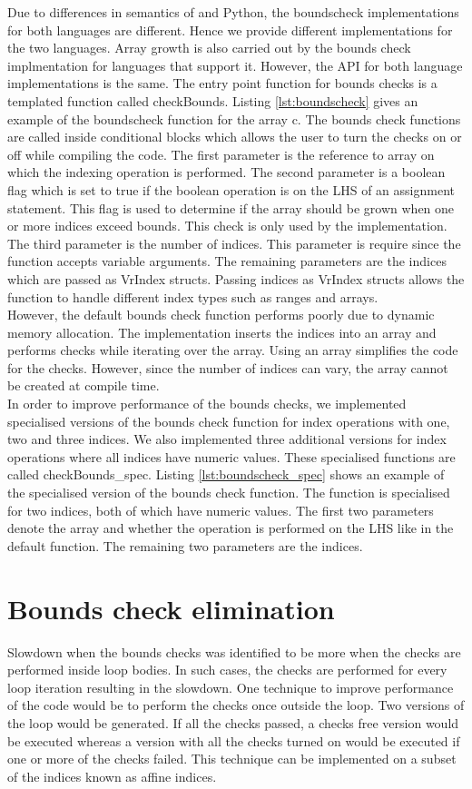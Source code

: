 Due to differences in semantics of \matlab and Python, the boundscheck implementations for both languages are different. Hence we provide different implementations for the two languages. Array growth is also carried out by the bounds check implmentation for languages that support it. However, the API for both language implementations is the same. The entry point function for bounds checks is a templated function called checkBounds. Listing \ref{lst:boundscheck} gives an example of the boundscheck function for the array c. The bounds check functions are called inside conditional blocks which allows the user to turn the checks on or off while compiling the code. The first parameter is the reference to array on which the indexing operation is performed. The second parameter is a boolean flag which is set to true if the boolean operation is on the LHS of an assignment statement. This flag is used to determine if the array should be grown when one or more indices exceed bounds. This check is only used by the \matlab implementation. The third parameter is the number of indices. This parameter is require since the function accepts variable arguments. The remaining parameters are the indices which are passed as VrIndex structs. Passing indices as VrIndex structs allows the function to handle different index types such as ranges and arrays. \\
However, the default bounds check function performs poorly due to dynamic memory allocation. The implementation inserts the indices into an array and performs checks while iterating over the array. Using an array simplifies the code for the checks. However, since the number of indices can vary, the array cannot be created at compile time.\\
In order to improve performance of the bounds checks, we implemented specialised versions of the bounds check function for index operations with one, two and three indices. We also implemented three additional versions for index operations where all indices have numeric values. These specialised functions are called checkBounds\_spec. Listing \ref{lst:boundscheck_spec} shows an example of the specialised version of the bounds check function. The function is specialised for two indices, both of which have numeric values. The first two parameters denote the array and whether the operation is performed on the LHS like in the default function. The remaining two parameters are the indices. 
\section{Bounds check elimination}
Slowdown when the bounds checks was identified to be more when the checks are performed inside loop bodies. In such cases, the checks are performed for every loop iteration resulting in the slowdown. One technique to improve performance of the code would be to perform the checks once outside the loop. Two versions of the loop would be generated. If all the checks passed, a checks free version would be executed whereas a version with all the checks turned on would be executed if one or more of the checks failed. This technique can be implemented on a subset of the indices known as affine indices. 
